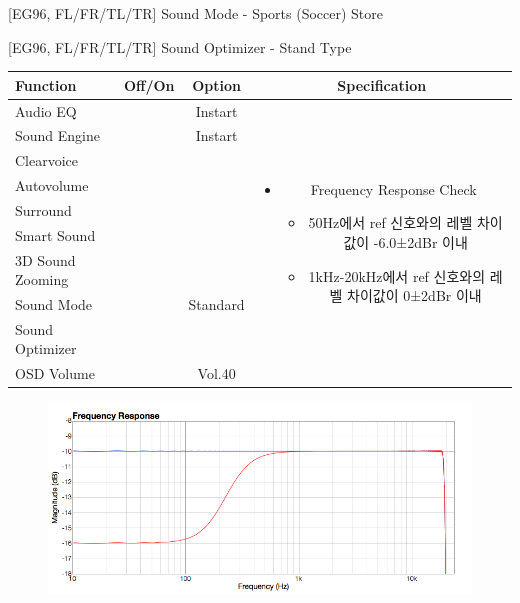\documentclass{beamer}
\begin{document}
\begin{frame}[t]{[EG96, FL/FR/TL/TR] Sound Mode - Sports (Soccer) Store}
\end{frame}


\begin{frame}[t]{[EG96, FL/FR/TL/TR] Sound Optimizer - Stand Type}
\begin{tiny}
\begin{tabular}{@{}lccc@{}}
\toprule
Function & Off/On & Option & Specification \\
\midrule
Audio EQ & \color{black}{Off} & Instart &
\multirow{10}{60mm}{
\begin{itemize}
\item Frequency Response Check
	\begin{itemize}
	\item 50Hz에서 ref 신호와의 레벨 차이값이 -6.0±2dBr 이내
	\item 1kHz-20kHz에서 ref 신호와의 레벨 차이값이 0±2dBr 이내
	\end{itemize}
\end{itemize}
} \\
Sound Engine & \color{blue}{On} & Instart & \\
Clearvoice & \color{black}{Off} & & \\
Autovolume & \color{black}{Off} & & \\
Surround & \color{black}{Off} & & \\
Smart Sound & \color{black}{Off} & & \\
3D Sound Zooming & \color{black}{Off} & & \\
Sound Mode & \color{blue}{On} & Standard & \\
Sound Optimizer & \color{blue}{On} & \color{blue}{Standtype} & \\
OSD Volume & \color{blue}{On} & Vol.40 & \\
\midrule
\end{tabular}
\end{tiny}

\begin{figure}[b]
\includegraphics[height=0.4\textwidth]{figure/EG96/standtype.png}
\end{figure}

\end{frame}
\end{document}
